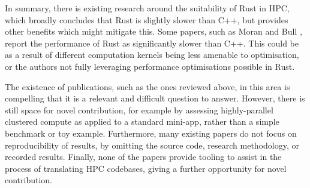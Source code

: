 In summary, there is existing research around the suitability of Rust in \acrshort{HPC}, which broadly concludes that Rust is slightly slower than C++, but provides other benefits which might mitigate this. Some papers, such as Moran and Bull \cite{moranEmergingTechnologiesRust2023}, report the performance of Rust as significantly slower than C++. This could be as a result of different computation kernels being less amenable to optimisation, or the authors not fully leveraging performance optimisations possible in Rust.

The existence of publications, such as the ones reviewed above, in this area is compelling that it is a relevant and difficult question to answer. However, there is still space for novel contribution, for example by assessing highly-parallel clustered compute as applied to a standard \acrshort{mini-app}, rather than a simple benchmark or toy example. Furthermore, many existing papers do not focus on reproducibility of results, by omitting the source code, research methodology, or recorded results. Finally, none of the papers provide tooling to assist in the process of translating \acrshort{HPC} codebases, giving a further opportunity for novel contribution.
